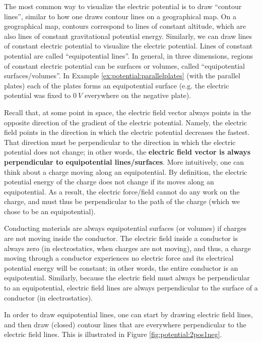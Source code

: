 The most common way to visualize the electric potential is to draw ``contour lines'', similar to how one draws contour lines on a geographical map. On a geographical map, contours correspond to lines of constant altitude, which are also lines of constant gravitational potential energy. Similarly, we can draw lines of constant electric potential to visualize the electric potential. Lines of constant potential are called ``equipotential lines''. In general, in three dimensions, regions of constant electric potential can be surfaces or volumes, called ``equipotential surfaces/volumes''. In Example \ref{ex:potential:parallelplates} (with the parallel plates) each of the plates forms an equipotential surface (e.g. the electric potential was fixed to $\SI{0}{V}$ everywhere on the negative plate). 

Recall that, at some point in space, the electric field vector always points in the opposite direction of the gradient of the electric potential. Namely, the electric field points in the direction in which the electric potential decreases the fastest. That direction must be perpendicular to the direction in which the electric potential does not change; in other words, the \textbf{electric field vector is always perpendicular to equipotential lines/surfaces}. More intuitively, one can think about a charge moving along an equipotential. By definition, the electric potential energy of the charge does not change if its moves along an equipotential. As a result, the electric force/field cannot do any work on the charge, and must thus be perpendicular to the path of the charge (which we chose to be an equipotential).

Conducting materials are always equipotential surfaces (or volumes) if charges are not moving inside the conductor. The electric field inside a conductor is always zero (in electrostatics, when charges are not moving), and thus, a charge moving through a conductor experiences no electric force and its electrical potential energy will be constant; in other words, the entire conductor is an equipotential. Similarly, because the electric field must always be perpendicular to an equipotential, electric field lines are always perpendicular to the surface of a conductor (in electrostatics).

In order to draw equipotential lines, one can start by drawing electric field lines, and then draw (closed) contour lines that are everywhere perpendicular to the electric field lines. This is illustrated in Figure \ref{fig:potential:2pos1neg}. 

